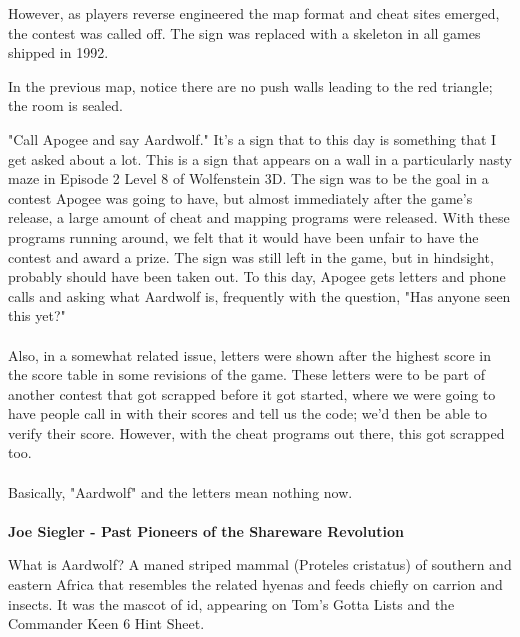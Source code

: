 \begin{minipage}{.5\textwidth}
However, as players reverse engineered the map format and cheat sites emerged, the contest was called off. The sign was replaced with a skeleton in all games shipped in 1992.\\
\par
In the previous map, notice there are no push walls leading to the red triangle; the room is sealed.\\
 \end{minipage}
\begin{minipage}{.5\textwidth}
\begin{figure}[H]
 \centering
\end{figure}
\end{minipage}
\bigskip
\par
\begin{fancyquotes}
"Call Apogee and say Aardwolf."  It's a sign that to this day is something
that I get asked about a lot.  This is a sign that appears on a wall in a
particularly nasty maze in Episode 2 Level 8 of Wolfenstein 3D.  The sign
was to be the goal in a contest Apogee was going to have, but almost
immediately after the game's release, a large amount of cheat and mapping
programs were released.  With these programs running around, we felt that
it would have been unfair to have the contest and award a prize.  The sign
was still left in the game, but in hindsight, probably should have been
taken out.  To this day, Apogee gets letters and phone calls and asking
what Aardwolf is, frequently with the question, "Has anyone seen this yet?"\\
\\
Also, in a somewhat related issue, letters were shown after the highest score
in the score table in some revisions of the game.  These letters were to be
part of another contest that got scrapped before it got started, where we were
going to have people call in with their scores and tell us the code; we'd then
be able to verify their score.  However, with the cheat programs out there,
this got scrapped too.\\
\\
Basically, "Aardwolf" and the letters mean nothing now.\\
\\
\textbf{Joe Siegler - Past Pioneers of the Shareware Revolution}
\end{fancyquotes}
\par
\bigskip
{} What is Aardwolf? A maned striped mammal (Proteles cristatus) of southern and eastern Africa that resembles the related hyenas and feeds chiefly on carrion and insects. It was the mascot of id, appearing on Tom's Gotta Lists and the Commander Keen 6 Hint Sheet.\\
\par

